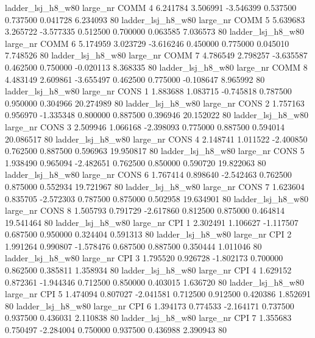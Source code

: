   ladder_lsj_h8_w80   large_nr     COMM                 4  6.241784  3.506991  -3.546399 0.537500 0.737500  0.041728    6.234093 80
  ladder_lsj_h8_w80   large_nr     COMM                 5  5.639683  3.265722  -3.577335 0.512500 0.700000  0.063585    7.036573 80
  ladder_lsj_h8_w80   large_nr     COMM                 6  5.174959  3.023729  -3.616246 0.450000 0.775000  0.045010    7.748526 80
  ladder_lsj_h8_w80   large_nr     COMM                 7  4.786549  2.798257  -3.635587 0.462500 0.750000 -0.020113    8.368335 80
  ladder_lsj_h8_w80   large_nr     COMM                 8  4.483149  2.609861  -3.655497 0.462500 0.775000 -0.108647    8.965992 80
  ladder_lsj_h8_w80   large_nr     CONS                 1  1.883688  1.083715  -0.745818 0.787500 0.950000  0.304966   20.274989 80
  ladder_lsj_h8_w80   large_nr     CONS                 2  1.757163  0.956970  -1.335348 0.800000 0.887500  0.396946   20.152022 80
  ladder_lsj_h8_w80   large_nr     CONS                 3  2.509946  1.066168  -2.398093 0.775000 0.887500  0.594014   20.086517 80
  ladder_lsj_h8_w80   large_nr     CONS                 4  2.148741  1.011522  -2.400850 0.762500 0.887500  0.596963   19.950817 80
  ladder_lsj_h8_w80   large_nr     CONS                 5  1.938490  0.965094  -2.482651 0.762500 0.850000  0.590720   19.822063 80
  ladder_lsj_h8_w80   large_nr     CONS                 6  1.767414  0.898640  -2.542463 0.762500 0.875000  0.552934   19.721967 80
  ladder_lsj_h8_w80   large_nr     CONS                 7  1.623604  0.835705  -2.572303 0.787500 0.875000  0.502958   19.634901 80
  ladder_lsj_h8_w80   large_nr     CONS                 8  1.505793  0.791729  -2.617860 0.812500 0.875000  0.464814   19.541464 80
  ladder_lsj_h8_w80   large_nr      CPI                 1  2.302491  1.106627  -1.117507 0.687500 0.950000  0.324404    0.591313 80
  ladder_lsj_h8_w80   large_nr      CPI                 2  1.991264  0.990807  -1.578476 0.687500 0.887500  0.350444    1.011046 80
  ladder_lsj_h8_w80   large_nr      CPI                 3  1.795520  0.926728  -1.802173 0.700000 0.862500  0.385811    1.358934 80
  ladder_lsj_h8_w80   large_nr      CPI                 4  1.629152  0.872361  -1.944346 0.712500 0.850000  0.403015    1.636720 80
  ladder_lsj_h8_w80   large_nr      CPI                 5  1.474094  0.807027  -2.041581 0.712500 0.912500  0.420386    1.852691 80
  ladder_lsj_h8_w80   large_nr      CPI                 6  1.394173  0.774533  -2.164171 0.737500 0.937500  0.436031    2.110838 80
  ladder_lsj_h8_w80   large_nr      CPI                 7  1.355683  0.750497  -2.284004 0.750000 0.937500  0.436988    2.390943 80
